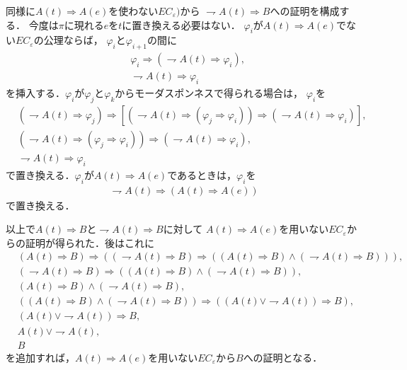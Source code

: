 	同様に$A(t) \Longrightarrow A(e)$を使わない$EC_{\varepsilon})$から
	$\rightharpoondown A(t) \Longrightarrow B$への証明を構成する．
	今度は$\pi$に現れる$e$を$t$に置き換える必要はない．
	$\varphi_{i}$が$A(t) \Longrightarrow A(e)$でない$EC_{\varepsilon}$の公理ならば，
	$\varphi_{i}$と$\varphi_{i+1}$の間に
	\begin{align}
		&\varphi_{i} \Longrightarrow (\rightharpoondown A(t) \Longrightarrow \varphi_{i}), \\
		&\rightharpoondown A(t) \Longrightarrow \varphi_{i}
	\end{align}
	を挿入する．$\varphi_{i}$が$\varphi_{j}$と$\varphi_{k}$からモーダスポンネスで得られる場合は，
	$\varphi_{i}$を
	\begin{align}
		&(\rightharpoondown A(t) \Longrightarrow \varphi_{j}) \Longrightarrow
		[(\rightharpoondown A(t) \Longrightarrow 
		(\varphi_{j}\Longrightarrow \varphi_{i}))
		\Longrightarrow (\rightharpoondown A(t) \Longrightarrow \varphi_{i})], \\
		&(\rightharpoondown A(t) \Longrightarrow 
		(\varphi_{j} \Longrightarrow \varphi_{i}))
		\Longrightarrow (\rightharpoondown A(t) \Longrightarrow \varphi_{i}), \\
		&\rightharpoondown A(t) \Longrightarrow \varphi_{i}
	\end{align}
	で置き換える．$\varphi_{i}$が$A(t) \Longrightarrow A(e)$であるときは，$\varphi_{i}$を
	\begin{align}
		\rightharpoondown A(t) \Longrightarrow (A(t) \Longrightarrow A(e))
	\end{align}
	で置き換える．
	
	以上で$A(t) \Longrightarrow B$と$\rightharpoondown A(t) \Longrightarrow B$に対して
	$A(t) \Longrightarrow A(e)$を用いない$EC_{\varepsilon}$からの証明が得られた．後はこれに
	\begin{align}
		&(A(t) \Longrightarrow B) \Longrightarrow
		((\rightharpoondown A(t) \Longrightarrow B) \Longrightarrow
		((A(t) \Longrightarrow B) \wedge (\rightharpoondown A(t) \Longrightarrow B))), \\
		&(\rightharpoondown A(t) \Longrightarrow B) \Longrightarrow
		((A(t) \Longrightarrow B) \wedge (\rightharpoondown A(t) \Longrightarrow B)), \\
		&(A(t) \Longrightarrow B) \wedge (\rightharpoondown A(t) \Longrightarrow B), \\
		&((A(t) \Longrightarrow B) \wedge (\rightharpoondown A(t) \Longrightarrow B))
		\Longrightarrow ((A(t) \vee \rightharpoondown A(t)) \Longrightarrow B), \\
		&(A(t) \vee \rightharpoondown A(t)) \Longrightarrow B, \\
		&A(t) \vee \rightharpoondown A(t), \\
		&B
	\end{align}
	を追加すれば，$A(t) \Longrightarrow A(e)$を用いない$EC_{\varepsilon}$から$B$への証明となる．